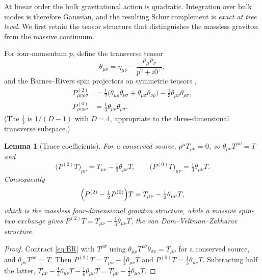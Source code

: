 \documentclass[11pt,a4paper]{article}
\theoremstyle{plain}
\newtheorem{lemma}[theorem]{Lemma}
\theoremstyle{definition}
\begin{document}
At linear order the bulk gravitational action is quadratic. Integration
over bulk modes is therefore Gaussian, and the resulting Schur complement
is \emph{exact at tree level}. We first retain the tensor structure that
distinguishes the massless graviton from the massive continuum.

For four-momentum $p$, define the transverse tensor
\begin{equation}
\label{eq:theta}
\theta_{\mu\nu}
=\eta_{\mu\nu}-\frac{p_\mu p_\nu}{p^2+i0^+},
\end{equation}
and the Barnes--Rivers spin projectors on symmetric tensors
\cite{PinheiroPires},
\begin{equation}
\label{eq:BR}
\begin{aligned}
P^{(2)}_{\mu\nu\rho\sigma}
&=\tfrac12\bigl(\theta_{\mu\rho}\theta_{\nu\sigma}
+\theta_{\mu\sigma}\theta_{\nu\rho}\bigr)
-\tfrac13\theta_{\mu\nu}\theta_{\rho\sigma},\\
P^{(0)}_{\mu\nu\rho\sigma}
&=\tfrac13\theta_{\mu\nu}\theta_{\rho\sigma}.
\end{aligned}
\end{equation}
(The $\tfrac13$ is $1/(D-1)$ with $D=4$, appropriate to the
three-dimensional transverse subspace.)

\begin{lemma}[Trace coefficients]
\label{lem:traces}
For a conserved source, $p^\mu T_{\mu\nu}=0$, so
$\theta_{\mu\nu}T^{\mu\nu}=T$ and
\begin{equation}
\label{eq:projT}
\bigl(P^{(2)}T\bigr)_{\mu\nu}=T_{\mu\nu}-\tfrac13\theta_{\mu\nu}T,
\qquad
\bigl(P^{(0)}T\bigr)_{\mu\nu}=\tfrac13\theta_{\mu\nu}T .
\end{equation}
Consequently
\begin{equation}
\label{eq:massless}
\Bigl(P^{(2)}-\tfrac12P^{(0)}\Bigr)T
=T_{\mu\nu}-\tfrac12\theta_{\mu\nu}T ,
\end{equation}
which is the massless four-dimensional graviton structure, while a
massive spin-two exchange gives $P^{(2)}T=T_{\mu\nu}
-\tfrac13\theta_{\mu\nu}T$, the van Dam--Veltman--Zakharov structure.
\end{lemma}

\begin{proof}
Contract \eqref{eq:BR} with $T^{\rho\sigma}$ using
$\theta_{\mu\rho}T^{\rho\sigma}\theta_{\sigma\nu}=T_{\mu\nu}$ for a
conserved source, and $\theta_{\rho\sigma}T^{\rho\sigma}=T$. Then
$P^{(2)}T=T_{\mu\nu}-\tfrac13\theta_{\mu\nu}T$ and
$P^{(0)}T=\tfrac13\theta_{\mu\nu}T$. Subtracting half the latter,
$T_{\mu\nu}-\tfrac13\theta_{\mu\nu}T-\tfrac16\theta_{\mu\nu}T
=T_{\mu\nu}-\tfrac12\theta_{\mu\nu}T$.
\end{proof}
\end{document}
